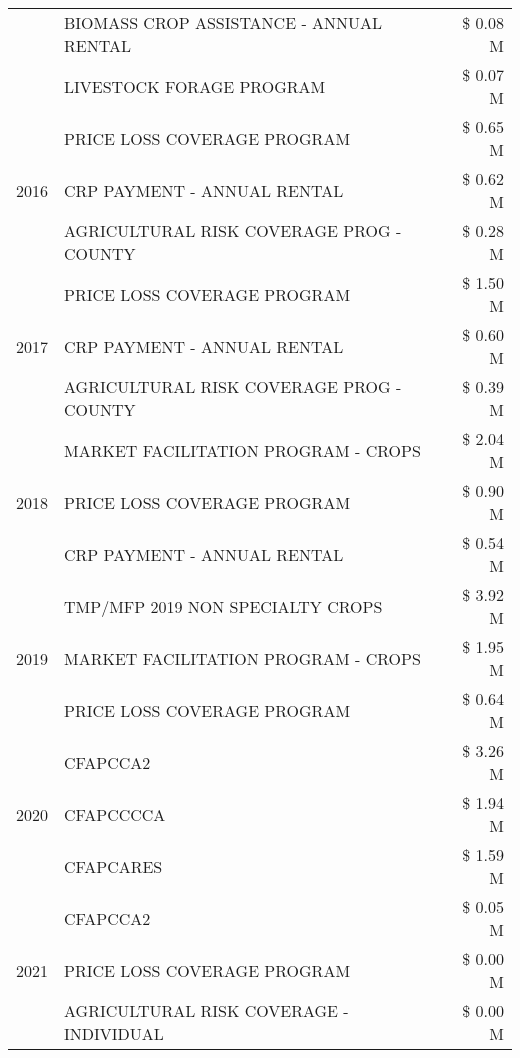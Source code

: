 \begin{tabular}{llr}
 & BIOMASS CROP ASSISTANCE - ANNUAL RENTAL & \$ 0.08 M \\
 & LIVESTOCK FORAGE PROGRAM & \$ 0.07 M \\
\cline{1-3}
\multirow[t]{3}{*}{2016} & PRICE LOSS COVERAGE PROGRAM & \$ 0.65 M \\
 & CRP PAYMENT - ANNUAL RENTAL & \$ 0.62 M \\
 & AGRICULTURAL RISK COVERAGE PROG - COUNTY & \$ 0.28 M \\
\cline{1-3}
\multirow[t]{3}{*}{2017} & PRICE LOSS COVERAGE PROGRAM & \$ 1.50 M \\
 & CRP PAYMENT - ANNUAL RENTAL & \$ 0.60 M \\
 & AGRICULTURAL RISK COVERAGE PROG - COUNTY & \$ 0.39 M \\
\cline{1-3}
\multirow[t]{3}{*}{2018} & MARKET FACILITATION PROGRAM - CROPS & \$ 2.04 M \\
 & PRICE LOSS COVERAGE PROGRAM & \$ 0.90 M \\
 & CRP PAYMENT - ANNUAL RENTAL & \$ 0.54 M \\
\cline{1-3}
\multirow[t]{3}{*}{2019} & TMP/MFP 2019 NON SPECIALTY CROPS & \$ 3.92 M \\
 & MARKET FACILITATION PROGRAM - CROPS & \$ 1.95 M \\
 & PRICE LOSS COVERAGE PROGRAM & \$ 0.64 M \\
\cline{1-3}
\multirow[t]{3}{*}{2020} & CFAPCCA2 & \$ 3.26 M \\
 & CFAPCCCCA & \$ 1.94 M \\
 & CFAPCARES & \$ 1.59 M \\
\cline{1-3}
\multirow[t]{3}{*}{2021} & CFAPCCA2 & \$ 0.05 M \\
 & PRICE LOSS COVERAGE PROGRAM & \$ 0.00 M \\
 & AGRICULTURAL RISK COVERAGE - INDIVIDUAL & \$ 0.00 M \\
\cline{1-3}
\bottomrule
\end{tabular}
